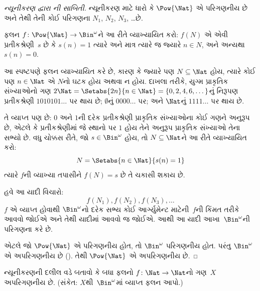 \begin{proof}[ન્યૂનીકરણ દ્વારા {}ની સાબિતી]
ન્યૂનીકરણ માટે ધારો કે $\Pow{\Nat}$ એ પરિગણનીય છે અને તેથી
તેની કોઈ પરિગણના $N_{1}$, $N_{2}$, $N_{3}$, \dots છે.

ફલન $f \colon \Pow{\Nat} \to \Bin^\omega$ને આ રીતે વ્યાખ્યાયિત
કરો: $f(N)$ એ એવી પ્રતીકશ્રેણી~$s$ છે કે $s(n) = 1$ ત્યારે અને
માત્ર ત્યારે જ જ્યારે $n \in N$, અને અન્યથા $s(n) = 0$.

આ સ્પષ્ટપણે ફલન વ્યાખ્યાયિત કરે છે, કારણ કે જ્યારે પણ
$N \subseteq \Nat$ હોય, ત્યારે કોઈ પણ $n \in \Nat$ એ $N$નો
ઘટક હોય અથવા ન હોય. દાખલા તરીકે, યુગ્મ પ્રાકૃતિક સંખ્યાઓનો
ગણ $2\Nat = \Setabs{2n}{n \in \Nat} = \{0,2, 4, 6,
\dots\}$નું નિરૂપણ પ્રતીકશ્રેણી $1010101\dots$ પર થાય છે;
$\emptyset$નું $0000\dots$ પર; અને $\Nat$નું $1111\dots$ પર થાય છે.

તે વ્યાપ્ત પણ છે: $0$ અને $1$ની દરેક પ્રતીકશ્રેણી પ્રાકૃતિક
સંખ્યાઓના કોઈ ગણને અનુરૂપ છે, એટલે કે પ્રતીકશ્રેણીમાં જે સ્થાનો પર
$1$ હોય તેને અનુરૂપ પ્રાકૃતિક સંખ્યાઓ તેના સભ્યો છે. વધુ ચોક્કસ રીતે,
જો $s \in \Bin^\omega$ હોય, તો $N \subseteq \Nat$ને આ રીતે
વ્યાખ્યાયિત કરો:
\[
N = \Setabs{n \in \Nat}{s(n) = 1}
\]
ત્યારે $f$ની વ્યાખ્યા તપાસીને $f(N) = s$ છે તે ચકાસી શકાય છે.

હવે આ યાદી વિચારો:
\[
f(N_1), f(N_2), f(N_3), \dots
\]
$f$ એ વ્યાપ્ત હોવાથી $\Bin^\omega$નો દરેક સભ્ય કોઈ
આર્ગ્યુમેન્ટ માટેની~$f$ની કિંમત તરીકે આવવો જોઈએ અને તેથી યાદીમાં આવવો જ
જોઈએ. આથી આ યાદી આખા~$\Bin^\omega$ની પરિગણના કરે છે.

એટલે જો $\Pow{\Nat}$ એ પરિગણનીય હોત, તો $\Bin^\omega$
પરિગણનીય હોત. પરંતુ $\Bin^\omega$ એ અપરિગણનીય છે
(). તેથી $\Pow{\Nat}$ એ
અપરિગણનીય છે.
\end{proof}


\begin{prob}\label{sfr:siz:red-alt:prob:nat-nat}
  ન્યૂનીકરણની દલીલ વડે બતાવો કે બધા ફલનો
  $f\colon \Nat \to \Nat$નો ગણ~$X$ અપરિગણનીય છે.
  (સંકેત: $X$થી~$\Bin^\omega$માં વ્યાપ્ત ફલન આપો.)
\end{prob}

